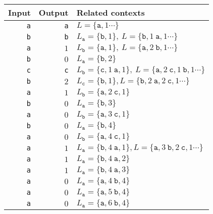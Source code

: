 \documentclass{article}
\begin{document}
\thispagestyle{empty}
  \begin{tabular}{rrl}
    Input & Output & Related contexts\\
    \hline
    {\tt a} & {\tt a} & $L=\{\mathtt{a},1\cdots\}$\\
    {\tt b} & {\tt b} & $L_{\mathtt{a}}=\{\mathtt{b},1\},~L=\{\mathtt{b},1~\mathtt{a},1\cdots\}$\\
    {\tt a} &     $1$ & $L_{\mathtt{b}}=\{\mathtt{a},1\},~L=\{\mathtt{a},2~\mathtt{b},1\cdots\}$\\
    {\tt b} &     $0$ & $L_{\mathtt{a}}=\{\mathtt{b},2\}$\\
    {\tt c} & {\tt c} & $L_{\mathtt{b}}=\{\mathtt{c},1~\mathtt{a},1\},~L=\{\mathtt{a},2~\mathtt{c},1~\mathtt{b},1\cdots\}$\\
    {\tt b} &     $2$ & $L_{\mathtt{c}}=\{\mathtt{b},1\}, L=\{\mathtt{b},2~\mathtt{a},2~\mathtt{c},1\cdots\}$\\ 
    {\tt a} &     $1$ & $L_{\mathtt{b}}=\{\mathtt{a},2~\mathtt{c},1\}$\\
    {\tt b} &     $0$ & $L_{\mathtt{a}}=\{\mathtt{b},3\}$\\
    {\tt a} &     $0$ & $L_{\mathtt{b}}=\{\mathtt{a},3~\mathtt{c},1\}$\\
    {\tt b} &     $0$ & $L_{\mathtt{a}}=\{\mathtt{b},4\}$\\
    {\tt a} &     $0$ & $L_{\mathtt{b}}=\{\mathtt{a},4~\mathtt{c},1\}$\\
    {\tt a} &     $1$ & $L_{\mathtt{a}}=\{\mathtt{b},4~\mathtt{a},1\}, L=\{\mathtt{a},3~\mathtt{b},2~\mathtt{c},1\cdots\}$\\
    {\tt a} &     $1$ & $L_{\mathtt{a}}=\{\mathtt{b},4~\mathtt{a},2\}$\\
    {\tt a} &     $1$ & $L_{\mathtt{a}}=\{\mathtt{b},4~\mathtt{a},3\}$\\
    {\tt a} &     $0$ & $L_{\mathtt{a}}=\{\mathtt{a},4~\mathtt{b},4\}$\\
    {\tt a} &     $0$ & $L_{\mathtt{a}}=\{\mathtt{a},5~\mathtt{b},4\}$\\
    {\tt a} &     $0$ & $L_{\mathtt{a}}=\{\mathtt{a},6~\mathtt{b},4\}$
  \end{tabular}
\end{document}

